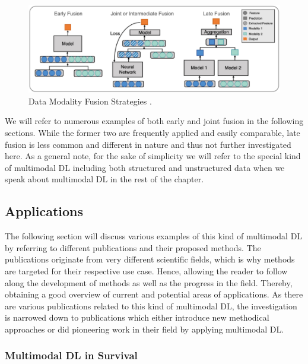 \documentclass[
]{krantz}
\begin{document}
\begin{figure}

{\centering \includegraphics[width=1\linewidth]{figures/03-02-struc+unstruc-data/Fusion_Strategies} 

}

\caption{Data Modality Fusion Strategies \citep[Adopted from][]{HuangFusion2020}.}\label{fig:fusion-strategies}
\end{figure}



We will refer to numerous examples of both early and joint fusion in the following sections. While the former two are frequently applied and easily comparable, late fusion is less common and different in nature and thus not further investigated here. As a general note, for the sake of simplicity we will refer to the special kind of multimodal DL including both structured and unstructured data when we speak about multimodal DL in the rest of the chapter.

\hypertarget{applications}{%
\subsection{Applications}\label{applications}}

The following section will discuss various examples of this kind of multimodal DL by referring to different publications and their proposed methods. The publications originate from very different scientific fields, which is why methods are targeted for their respective use case. Hence, allowing the reader to follow along the development of methods as well as the progress in the field. Thereby, obtaining a good overview of current and potential areas of applications. As there are various publications related to this kind of multimodal DL, the investigation is narrowed down to publications which either introduce new methodical approaches or did pioneering work in their field by applying multimodal DL.

\hypertarget{multimodal-dl-in-survival}{%
\subsubsection{Multimodal DL in Survival}\label{multimodal-dl-in-survival}}
\end{document}
